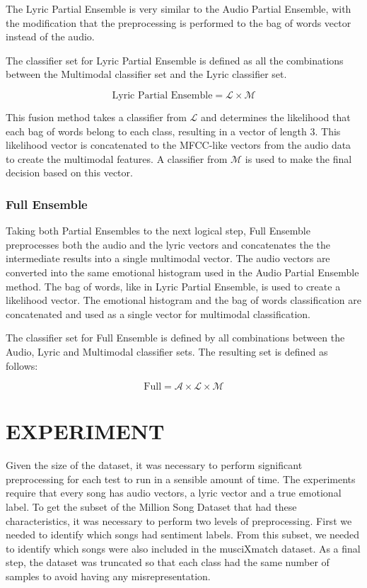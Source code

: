 The Lyric Partial Ensemble is very similar to the Audio Partial Ensemble, with the modification that the preprocessing is  
performed to the bag of words vector instead of the audio. 

The classifier set for Lyric Partial Ensemble is defined as all the combinations between the Multimodal classifier set and the Lyric classifier set. 

\[ \text{Lyric Partial Ensemble} = \mathcal{L} \times \mathcal{M}   \]


This fusion method takes a classifier from $\mathcal{L}$ and determines the likelihood that each bag of words belong to each class, resulting
in a vector of length 3. This likelihood vector is concatenated to the MFCC-like vectors from the audio data to create the multimodal features. 
A classifier from $\mathcal{M}$ is used to make the final decision based on this vector. 

\subsection{Full Ensemble}

Taking both Partial Ensembles to the next logical step, Full Ensemble preprocesses both the audio and the lyric vectors and concatenates the 
the intermediate results into a single multimodal vector. The audio vectors are converted into the same emotional histogram used in the Audio Partial
Ensemble method. The bag of words, like in Lyric Partial Ensemble, is used to create a likelihood vector. The emotional histogram and the bag of words classification are concatenated
and used as a single vector for multimodal classification.

The classifier set for Full Ensemble is defined by all combinations between the Audio, Lyric and Multimodal classifier sets. The resulting set is 
defined as follows:

\[ \text{Full} = \mathcal{A} \times  \mathcal{L} \times  \mathcal{M}\]


\chapter{EXPERIMENT}

Given the size of the dataset, it was necessary to perform significant preprocessing for each test to run in a sensible amount of time. The experiments require that every song has audio vectors, a lyric vector and a true emotional label. To get the subset of the Million Song Dataset that had these characteristics, it was necessary to perform two levels of preprocessing. First we needed to identify which songs had sentiment labels. From this subset, we needed to identify which songs were also included in the musciXmatch dataset. As a final step, the dataset was truncated so that each class had the same number of samples to avoid having any misrepresentation. 

